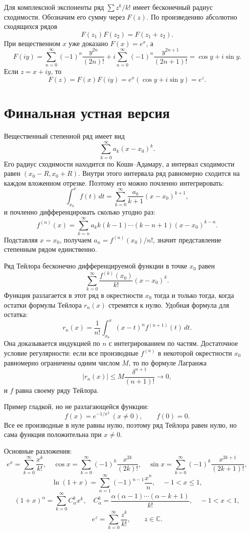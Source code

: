 \documentclass[12pt,a4paper]{article}
\newcommand{\CC}{\mathbb{C}}
\newcommand{\dd}{\,d}
\begin{document}
Для комплексной экспоненты ряд \(\sum z^k/k!\) имеет бесконечный радиус
сходимости. Обозначим его сумму через \(F(z)\). По произведению абсолютно
сходящихся рядов
\[
  F(z_1)F(z_2)=F(z_1+z_2).
\]
При вещественном \(x\) уже доказано \(F(x)=e^x\), а
\[
  F(iy)=
  \sum_{n=0}^{\infty}(-1)^n\frac{y^{2n}}{(2n)!}
  +i\sum_{n=0}^{\infty}(-1)^n\frac{y^{2n+1}}{(2n+1)!}
  =
  \cos y+i\sin y.
\]
Если \(z=x+iy\), то
\[
  F(z)=F(x)F(iy)=e^x(\cos y+i\sin y)=e^z.
\]

\section*{Финальная устная версия}

Вещественный степенной ряд имеет вид
\[
  \sum_{k=0}^{\infty}a_k(x-x_0)^k.
\]
Его радиус сходимости находится по Коши--Адамару, а интервал сходимости
равен \((x_0-R,x_0+R)\). Внутри этого интервала ряд равномерно сходится на
каждом вложенном отрезке. Поэтому его можно почленно интегрировать:
\[
  \int_{x_0}^{x}f(t)\dd t
  =
  \sum_{k=0}^{\infty}\frac{a_k}{k+1}(x-x_0)^{k+1},
\]
и почленно дифференцировать сколько угодно раз:
\[
  f^{(n)}(x)
  =
  \sum_{k=n}^{\infty}
  a_k k(k-1)\cdots(k-n+1)(x-x_0)^{k-n}.
\]
Подставляя \(x=x_0\), получаем \(a_n=f^{(n)}(x_0)/n!\), значит
представление степенным рядом единственно.

Ряд Тейлора бесконечно дифференцируемой функции в точке \(x_0\) равен
\[
  \sum_{k=0}^{\infty}\frac{f^{(k)}(x_0)}{k!}(x-x_0)^k.
\]
Функция разлагается в этот ряд в окрестности \(x_0\) тогда и только тогда,
когда остатки формулы Тейлора \(r_n(x)\) стремятся к нулю. Удобная формула
для остатка:
\[
  r_n(x)=\frac1{n!}\int_{x_0}^{x}(x-t)^nf^{(n+1)}(t)\dd t.
\]
Она доказывается индукцией по \(n\) с интегрированием по частям. Достаточное
условие регулярности: если все производные \(f^{(n)}\) в некоторой
окрестности \(x_0\) равномерно ограничены одним числом \(M\), то по формуле
Лагранжа
\[
  |r_n(x)|\le M\frac{\delta^{n+1}}{(n+1)!}\to0,
\]
и \(f\) равна своему ряду Тейлора.

Пример гладкой, но не разлагающейся функции:
\[
  f(x)=e^{-1/x^2}\ (x\ne0),\qquad f(0)=0.
\]
Все ее производные в нуле равны нулю, поэтому ряд Тейлора равен нулю, но сама
функция положительна при \(x\ne0\).

Основные разложения:
\[
  e^x=\sum_{k=0}^{\infty}\frac{x^k}{k!},\quad
  \cos x=\sum_{k=0}^{\infty}(-1)^k\frac{x^{2k}}{(2k)!},\quad
  \sin x=\sum_{k=0}^{\infty}(-1)^k\frac{x^{2k+1}}{(2k+1)!},
\]
\[
  \ln(1+x)=\sum_{n=1}^{\infty}(-1)^{n-1}\frac{x^n}{n},\quad -1<x\le1,
\]
\[
  (1+x)^\alpha=\sum_{k=0}^{\infty}C_\alpha^kx^k,\quad
  C_\alpha^k=\frac{\alpha(\alpha-1)\cdots(\alpha-k+1)}{k!},\quad -1<x<1,
\]
\[
  e^z=\sum_{k=0}^{\infty}\frac{z^k}{k!},\qquad z\in\CC.
\]
\end{document}
